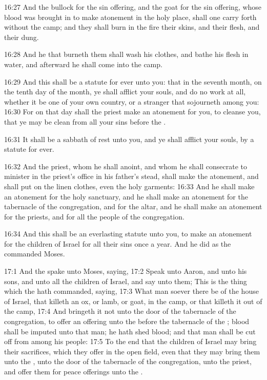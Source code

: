 16:27 And the bullock for the sin offering, and the goat for the sin offering, whose blood was brought in to make atonement in the holy place, shall one carry forth without the camp; and they shall burn in the fire their skins, and their flesh, and their dung.

16:28 And he that burneth them shall wash his clothes, and bathe his flesh in water, and afterward he shall come into the camp.

16:29 And this shall be a statute for ever unto you: that in the seventh month, on the tenth day of the month, ye shall afflict your souls, and do no work at all, whether it be one of your own country, or a stranger that sojourneth among you: 16:30 For on that day shall the priest make an atonement for you, to cleanse you, that ye may be clean from all your sins before the \LORD.

16:31 It shall be a sabbath of rest unto you, and ye shall afflict your souls, by a statute for ever.

16:32 And the priest, whom he shall anoint, and whom he shall consecrate to minister in the priest's office in his father's stead, shall make the atonement, and shall put on the linen clothes, even the holy garments: 16:33 And he shall make an atonement for the holy sanctuary, and he shall make an atonement for the tabernacle of the congregation, and for the altar, and he shall make an atonement for the priests, and for all the people of the congregation.

16:34 And this shall be an everlasting statute unto you, to make an atonement for the children of Israel for all their sins once a year.  And he did as the \LORD commanded Moses.

17:1 And the \LORD spake unto Moses, saying, 17:2 Speak unto Aaron, and unto his sons, and unto all the children of Israel, and say unto them; This is the thing which the \LORD hath commanded, saying, 17:3 What man soever there be of the house of Israel, that killeth an ox, or lamb, or goat, in the camp, or that killeth it out of the camp, 17:4 And bringeth it not unto the door of the tabernacle of the congregation, to offer an offering unto the \LORD before the tabernacle of the \LORD; blood shall be imputed unto that man; he hath shed blood; and that man shall be cut off from among his people: 17:5 To the end that the children of Israel may bring their sacrifices, which they offer in the open field, even that they may bring them unto the \LORD, unto the door of the tabernacle of the congregation, unto the priest, and offer them for peace offerings unto the \LORD.

